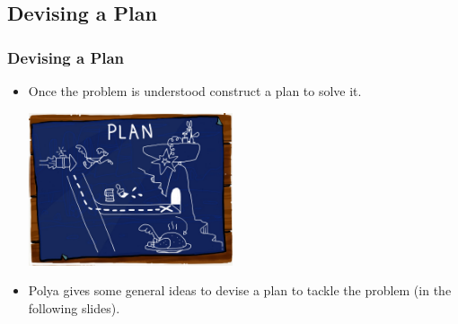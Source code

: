 \documentclass{beamer}
\begin{document}
\fi

\subsection{Devising a Plan}

\begin{frame}%
\frametitle{Devising a Plan}

\begin{itemize}

\item Once the problem is understood construct a plan to solve it.

\begin{center}
\includegraphics[width=6cm]{bipbip.jpg}
\end{center}

\vspace{0.5cm}

\item<2-> Polya gives some general ideas to devise a plan to tackle the problem (in the following slides).

\end{itemize}

\end{frame}
\end{document}
